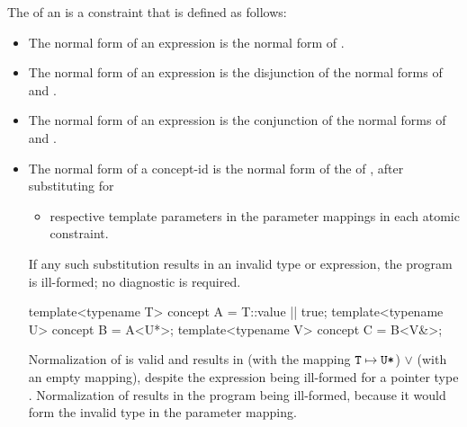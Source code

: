 \documentclass{wg21}
\begin{document}
\pnum
The  of an   is
a constraint  that is defined as follows:
%
\begin{itemize}
\item
The normal form of an expression  is
the normal form of .

\item
The normal form of an expression  is
the disjunction  of
the normal forms of  and .

\item
The normal form of an expression 
is the conjunction of
the normal forms of  and .

\item
The normal form of a concept-id 
is the normal form of the  of ,
after substituting  for
\begin{itemize}
\item
{}  respective template parameters in the
parameter mappings in each atomic constraint.
\end{itemize}
If any such substitution results in an invalid type or expression,
the program is ill-formed; no diagnostic is required.

\begin{example}
    \begin{codeblock}
        template<typename T> concept A = T::value || true;
        template<typename U> concept B = A<U*>;
        template<typename V> concept C = B<V&>;
    \end{codeblock}
    Normalization of  
    is valid and results in
     (with the mapping $\texttt{T} \mapsto \texttt{U*}$)
    $\lor$
     (with an empty mapping),
    despite the expression  being ill-formed
    for a pointer type .
    Normalization of  
    results in the program being ill-formed,
    because it would form the invalid type 
    in the parameter mapping.
\end{example}


\end{itemize}
\end{document}
